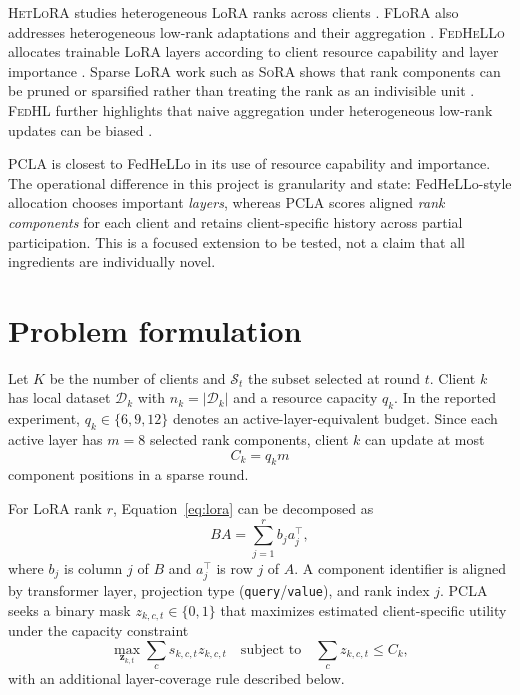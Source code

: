\documentclass[11pt,a4paper]{article}
\begin{document}
\textsc{HetLoRA} studies heterogeneous LoRA ranks across clients
\cite{hetlora}. \textsc{FLoRA} also addresses heterogeneous low-rank
adaptations and their aggregation \cite{flora}. \textsc{FedHeLLo} allocates
trainable LoRA layers according to client resource capability and layer
importance \cite{fedhello}. Sparse LoRA work such as \textsc{SoRA} shows that
rank components can be pruned or sparsified rather than treating the rank as an
indivisible unit \cite{sora}. \textsc{FedHL} further highlights that naive
aggregation under heterogeneous low-rank updates can be biased
\cite{fedhl}.

PCLA is closest to FedHeLLo in its use of resource capability and importance.
The operational difference in this project is granularity and state:
FedHeLLo-style allocation chooses important \emph{layers}, whereas PCLA scores
aligned \emph{rank components} for each client and retains client-specific
history across partial participation. This is a focused extension to be tested,
not a claim that all ingredients are individually novel.

\section{Problem formulation}

Let $K$ be the number of clients and $\mathcal{S}_t$ the subset selected at
round $t$. Client $k$ has local dataset $\mathcal{D}_k$ with
$n_k=|\mathcal{D}_k|$ and a resource capacity $q_k$. In the reported
experiment, $q_k\in\{6,9,12\}$ denotes an active-layer-equivalent budget. Since
each active layer has $m=8$ selected rank components, client $k$ can update at
most
\begin{equation}
  C_k=q_km
\end{equation}
component positions in a sparse round.

For LoRA rank $r$, Equation~\ref{eq:lora} can be decomposed as
\begin{equation}
  BA = \sum_{j=1}^{r} b_j a_j^\top ,
  \label{eq:components}
\end{equation}
where $b_j$ is column $j$ of $B$ and $a_j^\top$ is row $j$ of $A$. A component
identifier is aligned by transformer layer, projection type
(\texttt{query}/\texttt{value}), and rank index $j$. PCLA seeks a binary mask
$z_{k,c,t}\in\{0,1\}$ that maximizes estimated client-specific utility under
the capacity constraint
\begin{equation}
  \max_{\mathbf z_{k,t}}\sum_c s_{k,c,t}z_{k,c,t}
  \quad\text{subject to}\quad
  \sum_c z_{k,c,t}\le C_k,
  \label{eq:allocation}
\end{equation}
with an additional layer-coverage rule described below.
\end{document}
